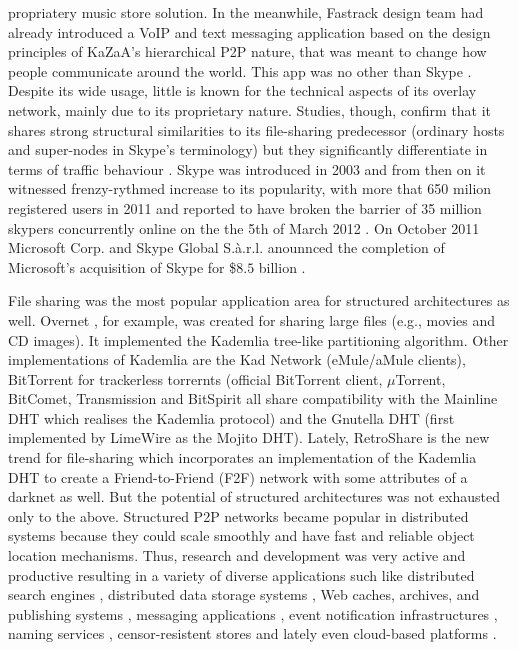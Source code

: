 propriatery music store solution. In the meanwhile, Fastrack design team had
already introduced a VoIP and text messaging application based on the design
principles of KaZaA's hierarchical P2P nature, that was meant to change how
people communicate around the world. This app was no other than Skype
\cite{skype}. Despite its wide usage, little is known for the technical aspects
of its overlay network, mainly due to its proprietary nature. Studies, though,
confirm that it shares strong structural similarities to its file-sharing
predecessor (ordinary hosts and super-nodes in Skype's terminology) but they
significantly differentiate in terms of traffic behaviour
\cite{g_voipskypesec_2005,gdj_skypestudy_2006}. Skype was introduced in 2003
and from then on it witnessed frenzy-rythmed increase to its popularity, with
more that 650 milion registered users in 2011 \cite{skypetotalusers} and
reported to have broken the barrier of 35 million skypers concurrently online on
the the 5th of March 2012 \cite{skypesymusers}. On October 2011 Microsoft Corp.
and Skype Global S.à.r.l. anounnced the completion of Microsoft's acquisition of
Skype for \$$8.5$ billion \cite{skypemicrosoft}.

File sharing was the most popular application area for structured architectures
as well. Overnet
\cite{},
for example, was created for sharing large files (e.g., movies and CD images).
It implemented the Kademlia tree-like partitioning algorithm. Other
implementations of Kademlia are the Kad Network (eMule/aMule  clients),
BitTorrent for trackerless torrernts (official BitTorrent client, $\mu$Torrent,
BitComet, Transmission and BitSpirit all share compatibility with the Mainline
DHT which realises the Kademlia protocol) and the Gnutella DHT (first
implemented by LimeWire as the Mojito DHT). Lately, RetroShare \cite{retroshare}
is the new trend for file-sharing which incorporates an implementation of the
Kademlia DHT to create a Friend-to-Friend (F2F) network with some attributes of
a darknet as well. But the potential of structured architectures was not
exhausted only to the above. Structured P2P networks became popular in
distributed systems because they could scale smoothly and have fast and reliable
object location mechanisms. Thus, research and development was very active and
productive resulting in a variety of diverse applications such like distributed
search engines \cite{yaci}, distributed data storage systems
\cite{kbc_oceanstore_2000,bdet_fsdfs_2000,dkkms_cfs_2001,dr_pastutility_2001,abc_farsite_2002,mmfc_ivy_2002,arla,agebh_dks_2003}, Web caches, archives,
and publishing systems \cite{ird_squirrel_2002,bags_youserv_2002,wrc_publius_2000,wm_tangler_2001},
messaging applications \cite{threedegrees}, event notification infrastructures
\cite{rkcd_scribe_2001,cdkr_scribe_2002,agebh_dks_2003}, naming services
\cite{cmm_chorddns_2002}, censor-resistent stores \cite{cswh_freenet_2001} and
lately even cloud-based platforms \cite{mgpj_cloudsnap_2011}.

